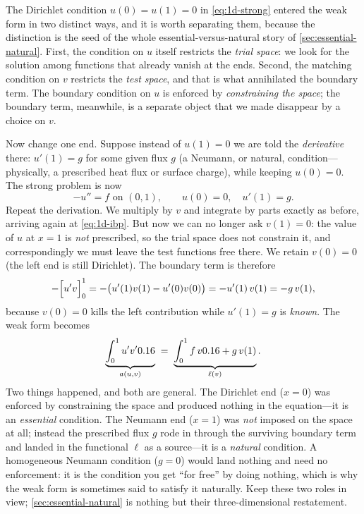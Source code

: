 The Dirichlet condition $u(0)=u(1)=0$ in \cref{eq:1d-strong} entered the weak
form in two distinct ways, and it is worth separating them, because the
distinction is the seed of the whole essential-versus-natural story of
\cref{sec:essential-natural}. First, the condition on $u$ itself restricts the
\emph{trial space}: we look for the solution among functions that already vanish
at the ends. Second, the matching condition on $v$ restricts the \emph{test
space}, and that is what annihilated the boundary term. The boundary condition on
$u$ is enforced by \emph{constraining the space}; the boundary term, meanwhile,
is a separate object that we made disappear by a choice on $v$.

Now change one end. Suppose instead of $u(1)=0$ we are told the \emph{derivative}
there: $u'(1) = g$ for some given flux $g$ (a Neumann, or natural, condition---
physically, a prescribed heat flux or surface charge), while keeping $u(0)=0$.
The strong problem is now
\[
  -u'' = f \text{ on } (0,1), \qquad u(0)=0, \quad u'(1)=g.
\]
Repeat the derivation. We multiply by $v$ and integrate by parts exactly as
before, arriving again at \cref{eq:1d-ibp}. But now we can no longer ask $v(1)=0$:
the value of $u$ at $x=1$ is \emph{not} prescribed, so the trial space does not
constrain it, and correspondingly we must leave the test functions free there.
We retain $v(0)=0$ (the left end is still Dirichlet). The boundary term is
therefore
\[
  -\Bigl[u'v\Bigr]_0^1 = -\bigl(u'(1)v(1) - u'(0)v(0)\bigr)
  = -u'(1)\,v(1) = -g\,v(1),
\]
because $v(0)=0$ kills the left contribution while $u'(1)=g$ is \emph{known}. The
weak form becomes
\begin{equation}
  \underbrace{\int_0^1 u'v'0.16}_{a(u,v)}
  \;=\;
  \underbrace{\int_0^1 f\,v0.16 + g\,v(1)}_{\ell(v)}.
  \label{eq:1d-neumann-weak}
\end{equation}
Two things happened, and both are general. The Dirichlet end ($x=0$) was
enforced by constraining the space and produced nothing in the equation---it is
an \emph{essential} condition. The Neumann end ($x=1$) was \emph{not} imposed on
the space at all; instead the prescribed flux $g$ rode in through the surviving
boundary term and landed in the functional $\ell$ as a source---it is a
\emph{natural} condition. A homogeneous Neumann condition ($g=0$) would land
nothing and need no enforcement: it is the condition you get ``for free'' by
doing nothing, which is why the weak form is sometimes said to satisfy it
naturally. Keep these two roles in view; \cref{sec:essential-natural} is nothing
but their three-dimensional restatement.

